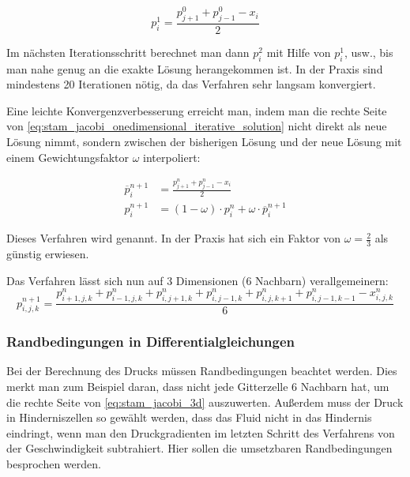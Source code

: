 \begin{equation}
\label{eq:stam_jacobi_onedimensional_iterative_solution}
p_i^1
=
\frac{
	p_{j+1}^{0} + p_{j-1}^{0} - x_i
}
{
	2
}
\end{equation}

Im nächsten Iterationsschritt berechnet man dann $p_i^2$ mit Hilfe von $p_i^1$,
usw., bis man nahe genug an die exakte Lösung herangekommen ist. In der Praxis
sind mindestens 20 Iterationen nötig, da das Verfahren sehr langsam konvergiert.

Eine leichte Konvergenzverbesserung erreicht man, indem man die rechte Seite von
\cref{eq:stam_jacobi_onedimensional_iterative_solution} nicht direkt als neue
Lösung nimmt, sondern zwischen der bisherigen Lösung und der neue Lösung mit
einem Gewichtungsfaktor $\omega$ interpoliert:

\begin{align}
\overline{p}_i^{n+1}
&=
\frac{
	p_{j+1}^{n} + p_{j-1}^{n} - x_i
}
{
	2
} \\
p_i^{n+1}
&=
(1-\omega) \cdot p_i^n + \omega \cdot \overline{p}_i^{n+1}
\end{align}

Dieses Verfahren wird  genannt. In
der Praxis hat sich ein Faktor von $\omega=\frac{2}{3}$ als günstig erwiesen.

Das Verfahren lässt sich nun auf 3 Dimensionen (6 Nachbarn) verallgemeinern:
\begin{equation}
\label{eq:stam_jacobi_3d}
p_{i,j,k}^{n+1}
=
\frac{
	p_{i+1,j,k}^n +
	p_{i-1,j,k}^n +
	p_{i,j+1,k}^n +
	p_{i,j-1,k}^n +
	p_{i,j,k+1}^n +
	p_{i,j-1,k-1}^n -
	x_{i,j,k}^n
}
{
	6
}
\end{equation}

\subsubsection{Randbedingungen in Differentialgleichungen}
\label{sec:stam_boundaries}

Bei der Berechnung des Drucks müssen Randbedingungen beachtet
werden. Dies merkt man zum Beispiel daran, dass nicht jede Gitterzelle
6 Nachbarn hat, um die rechte Seite von \cref{eq:stam_jacobi_3d}
auszuwerten. Außerdem muss der Druck in Hinderniszellen so gewählt
werden, dass das Fluid nicht in das Hindernis eindringt, wenn man den
Druckgradienten im letzten Schritt des Verfahrens von der
Geschwindigkeit subtrahiert. Hier sollen die umsetzbaren
Randbedingungen besprochen werden.

